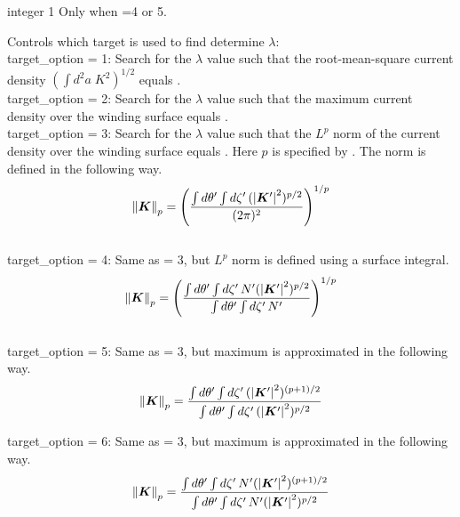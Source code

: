 {integer}
{1}
{Only when =4 or 5.}
{Controls which target is used to find determine $\lambda$:\\

{\ttfamily target\_option} = 1: Search for the $\lambda$ value such that the root-mean-square current density
$\left( \int d^2a\; K^2 \right)^{1/2}$ equals .\\

{\ttfamily target\_option} = 2: Search for the $\lambda$ value such that the maximum
current density over the winding surface equals .\\

{\ttfamily target\_option} = 3: Search for the $\lambda$ value such that the $L^p$ norm of the current 
density over the winding surface equals . Here $p$ is specified by 
. The norm is defined in the following way.
\begin{gather}
\norm{\bm{K}}_p = \left( \frac{\int d \theta' \int d \zeta' \, (\abs{\bm{K}'}^2)^{p/2}}{(2\pi)^2} \right)^{1/p}
\end{gather}\\

{\ttfamily target\_option} = 4: Same as  = 3, but $L^p$ norm is defined using a
surface integral.
\begin{gather}
\norm{\bm{K}}_p = \left( \frac{\int d \theta' \int d \zeta' \, N' (\abs{\bm{K}'}^2)^{p/2}}{\int d \theta' \int d \zeta' \, N'} \right)^{1/p}
\end{gather} \\

{\ttfamily target\_option} = 5: Same as  = 3, but maximum is approximated in the following way.
\begin{gather}
\norm{\bm{K}}_p = \frac{ \int d \theta' \int d \zeta' \, (\abs{\bm{K}'}^2)^{(p+1)/2}}{  \int d \theta' \int d \zeta' \, (\abs{\bm{K}'}^2)^{p/2} }
\end{gather}

{\ttfamily target\_option} = 6: Same as  = 3, but maximum is approximated in the following way.
\begin{gather}
\norm{\bm{K}}_p = \frac{ \int d \theta' \int d \zeta' \, N' (\abs{\bm{K}'}^2)^{(p+1)/2}}{  \int d \theta' \int d \zeta' \, N' (\abs{\bm{K}'}^2)^{p/2} }
\end{gather}

}
